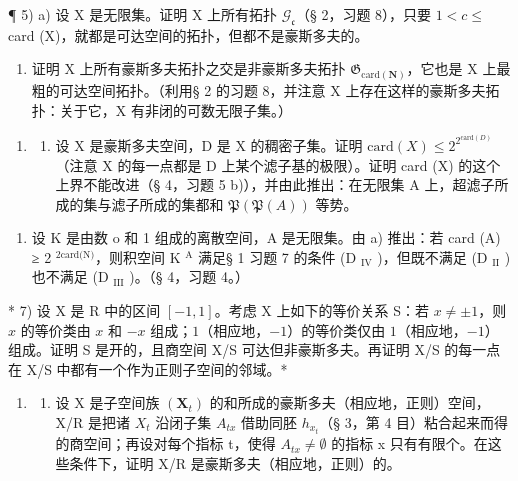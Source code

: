 ¶ 5) a) 设 X 是无限集。证明 X 上所有拓扑 \(\mathcal{G}_{\mathfrak{c}}\)（§ 2，习题 8），只要 \(1 < c \leqslant\) card (X)，就都是可达空间的拓扑，但都不是豪斯多夫的。

\begin{enumerate}
\def\labelenumi{\alph{enumi})}
\setcounter{enumi}{1}
\tightlist
\item
  证明 X 上所有豪斯多夫拓扑之交是非豪斯多夫拓扑 \(\mathfrak{G}_{\mathrm{card}(\mathbf{N})}\)，它也是 X 上最粗的可达空间拓扑。（利用§ 2 的习题 8，并注意 X 上存在这样的豪斯多夫拓扑：关于它，X 有非闭的可数无限子集。）
\end{enumerate}

\begin{enumerate}
\def\labelenumi{\arabic{enumi})}
\setcounter{enumi}{5}
\tightlist
\item
  \begin{enumerate}
  \def\labelenumii{\alph{enumii})}
  \tightlist
  \item
    设 X 是豪斯多夫空间，D 是 X 的稠密子集。证明 \(\text{card}(X) \leqslant 2^{2^{\text{card}(D)}}\)（注意 X 的每一点都是 D 上某个滤子基的极限）。证明 card (X) 的这个上界不能改进（§ 4，习题 5 b)），并由此推出：在无限集 A 上，超滤子所成的集与滤子所成的集都和 \(\mathfrak{P}(\mathfrak{P}(A))\) 等势。
  \end{enumerate}
\end{enumerate}

\begin{enumerate}
\def\labelenumi{\alph{enumi})}
\setcounter{enumi}{1}
\tightlist
\item
  设 K 是由数 o 和 1 组成的离散空间，A 是无限集。由 a) 推出：若 card (A) ≥ 2 \(^{2\text{card(N)}}\)，则积空间 K \(^{\text{A}}\) 满足§ 1 习题 7 的条件 (D \(_{\text{IV}}\) )，但既不满足 (D \(_{\text{II}}\) ) 也不满足 (D \(_{\text{III}}\) )。（§ 4，习题 4。）
\end{enumerate}

* 7) 设 X 是 R 中的区间 \([-1, 1]\)。考虑 X 上如下的等价关系 S：若 \(x \neq \pm 1\)，则 \(x\) 的等价类由 \(x\) 和 \(-x\) 组成；\(1\)（相应地，\(-1\)）的等价类仅由 \(1\)（相应地，\(-1\)）组成。证明 S 是开的，且商空间 X/S 可达但非豪斯多夫。再证明 X/S 的每一点在 X/S 中都有一个作为正则子空间的邻域。*

\begin{enumerate}
\def\labelenumi{\arabic{enumi})}
\setcounter{enumi}{7}
\tightlist
\item
  \begin{enumerate}
  \def\labelenumii{\alph{enumii})}
  \tightlist
  \item
    设 X 是子空间族 \((\mathbf{X}_{t})\) 的和所成的豪斯多夫（相应地，正则）空间，X/R 是把诸 \(X_{t}\) 沿闭子集 \(A_{tx}\) 借助同胚 \(h_{x_{t}}\)（§ 3，第 4 目）粘合起来而得的商空间；再设对每个指标 t，使得 \(A_{tx} \neq \emptyset\) 的指标 x 只有有限个。在这些条件下，证明 X/R 是豪斯多夫（相应地，正则）的。
  \end{enumerate}
\end{enumerate}

